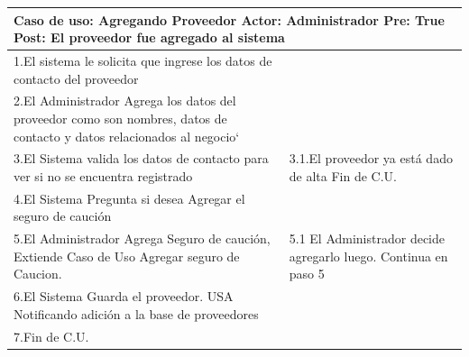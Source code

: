 \begin{longtable}{| p{} | p{} |}
    \hline
    \multicolumn{2}{|p{16cm}|}{
        \textbf{Caso de uso:} Agregando Proveedor \newline
        \textbf{Actor:} Administrador\newline
        \textbf{Pre:}  True\newline
        \textbf{Post:} El proveedor fue agregado al sistema
    }\\
    \hline
    1.El sistema le solicita que ingrese los datos de contacto del proveedor & \\
    \hline
    2.El Administrador Agrega los datos del proveedor como son nombres, datos de contacto y datos relacionados al negocio` &  \\
    \hline
    3.El Sistema valida los datos de contacto para ver si no se encuentra registrado & 3.1.El proveedor ya está dado de alta \newline 3.2 Fin de C.U.  \\
    \hline
    4.El Sistema Pregunta si desea Agregar el seguro de caución&\\
    \hline
    5.El Administrador Agrega Seguro de caución, Extiende Caso de Uso Agregar seguro de Caucion. & 5.1 El Administrador decide agregarlo luego. Continua en paso 5 \\
    \hline
    6.El Sistema Guarda el proveedor. USA Notificando adición a la base de proveedores& \\
    \hline
    7.Fin de C.U.& \\
    \hline
\end{longtable}


